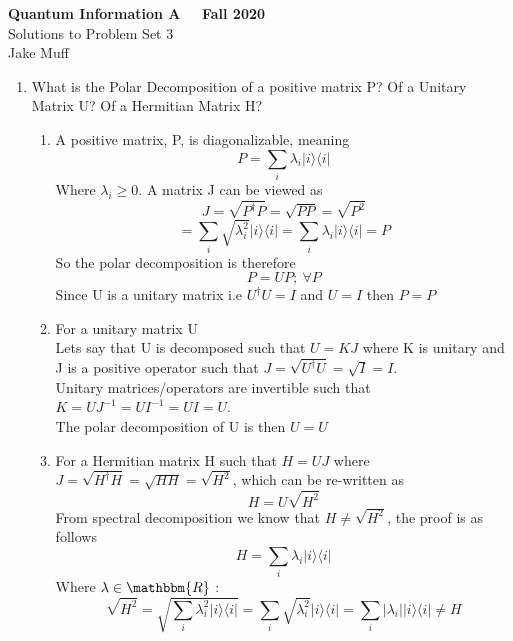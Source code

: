 \documentclass[12pt]{article}
\newcommand{\ket}[1]{\vert{#1}\rangle}
\newcommand{\bra}[1]{\langle{#1}\vert}
\begin{document}
\normalsize

\baselineskip 14pt

\begin{center}
{\Large {\bf Quantum Information A \ \ Fall 2020 }} \\
{\Large Solutions to Problem Set 3} \\
Jake Muff

\end{center}


\begin{enumerate}

\item What is the Polar Decomposition of a positive matrix P? Of a Unitary Matrix U? Of a Hermitian Matrix H? \\

\begin{enumerate}
    \item A positive matrix, P,  is diagonalizable, meaning
    $$ P = \sum_i \lambda_i \ket{i} \bra{i} $$
    Where $\lambda_i \geq 0$. A matrix J can be viewed as 
    $$ J = \sqrt{P^\dagger P}  = \sqrt{PP} = \sqrt{P^2} $$
    $$ = \sum_i \sqrt{\lambda_i^2} \ket{i} \bra{i} = \sum_i \lambda_i \ket{i} \bra{i} =P $$
    So the polar decomposition is therefore 
    $$ P = UP ;\ \forall P $$ 
    Since U is a unitary matrix i.e $ U^\dagger U = I$ and $U=I$ then $P=P$ 
    \item For a unitary matrix U
    \\ 
    Lets say that U is decomposed such that $U = KJ$ where K is unitary and J is a positive operator such that $J= \sqrt{U^\dagger U} = \sqrt{I} = I$.\\
    Unitary matrices/operators are invertible such that $K = UJ^{-1} = U I^{-1} = UI = U$.
    \\
    The polar decomposition of U is then $U=U$ 
    \item For a Hermitian matrix H such that $H=UJ$ where $J= \sqrt{H^\dagger H} = \sqrt{HH} = \sqrt{H^2} $, which can be re-written as 
    $$ H = U\sqrt{H^2} $$ 
    From spectral decomposition we know that $H \neq \sqrt{H^2} $, the proof is as follows
    $$ H = \sum_i \lambda_i \ket{i} \bra{i} $$
    Where $\lambda \in \mathbbm{R}$ :
    $$ \sqrt{H^2} = \sqrt{\sum_i \lambda_i^2 \ket{i} \bra{i}} = \sum_i \sqrt{\lambda_i^2} \ket{i} \bra{i} = \sum_i | \lambda_i | \ket{i} \bra{i} \neq H$$
\end{enumerate}



\end{enumerate}
\end{document}
